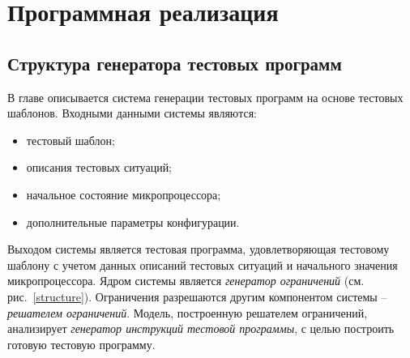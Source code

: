 \chapter{Программная реализация}

%

\section{Структура генератора тестовых программ}

В главе описывается система генерации тестовых программ на основе
тестовых шаблонов. Входными данными системы являются:
\begin{itemize}
\item тестовый шаблон;
\item описания тестовых ситуаций;
\item начальное состояние микропроцессора;
\item дополнительные параметры конфигурации.
\end{itemize}

Выходом системы является тестовая программа, удовлетворяющая
тестовому шаблону с учетом данных описаний тестовых ситуаций и
начального значения микропроцессора. Ядром системы является
\emph{генератор ограничений} (см. рис.~\ref{structure}). Ограничения
разрешаются другим компонентом системы -- \emph{решателем
ограничений}. Модель, построенную решателем ограничений, анализирует
\emph{генератор инструкций тестовой программы}, с целью построить
готовую тестовую программу.

